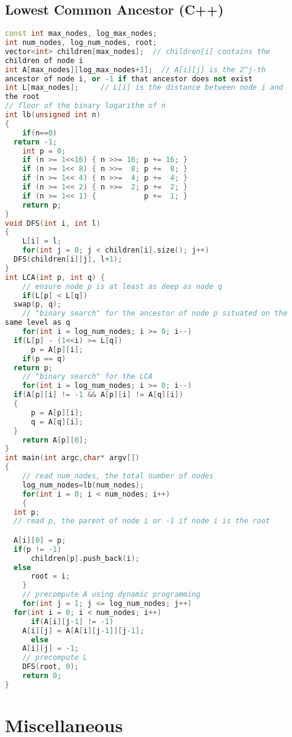 \subsection{Lowest Common Ancestor (C++)}
\begin{lstlisting}[language=C++]
const int max_nodes, log_max_nodes;
int num_nodes, log_num_nodes, root;
vector<int> children[max_nodes];  // children[i] contains the 
children of node i
int A[max_nodes][log_max_nodes+1];  // A[i][j] is the 2^j-th 
ancestor of node i, or -1 if that ancestor does not exist
int L[max_nodes];     // L[i] is the distance between node i and 
the root
// floor of the binary logarithm of n
int lb(unsigned int n)
{
    if(n==0)
  return -1;
    int p = 0;
    if (n >= 1<<16) { n >>= 16; p += 16; }
    if (n >= 1<< 8) { n >>=  8; p +=  8; }
    if (n >= 1<< 4) { n >>=  4; p +=  4; }
    if (n >= 1<< 2) { n >>=  2; p +=  2; }
    if (n >= 1<< 1) {           p +=  1; }
    return p;
}
void DFS(int i, int l)
{
    L[i] = l;
    for(int j = 0; j < children[i].size(); j++)
  DFS(children[i][j], l+1);
}
int LCA(int p, int q) {
    // ensure node p is at least as deep as node q
    if(L[p] < L[q])
  swap(p, q);
    // "binary search" for the ancestor of node p situated on the 
same level as q
    for(int i = log_num_nodes; i >= 0; i--)
  if(L[p] - (1<<i) >= L[q])
      p = A[p][i];
    if(p == q)
  return p;
    // "binary search" for the LCA
    for(int i = log_num_nodes; i >= 0; i--)
  if(A[p][i] != -1 && A[p][i] != A[q][i])
  {
      p = A[p][i];
      q = A[q][i];
  }
    return A[p][0];
}
int main(int argc,char* argv[])
{
    // read num_nodes, the total number of nodes
    log_num_nodes=lb(num_nodes);
    for(int i = 0; i < num_nodes; i++)
    {
  int p;
  // read p, the parent of node i or -1 if node i is the root

  A[i][0] = p;
  if(p != -1)
      children[p].push_back(i);
  else
      root = i;
    }
    // precompute A using dynamic programming
    for(int j = 1; j <= log_num_nodes; j++)
  for(int i = 0; i < num_nodes; i++)
      if(A[i][j-1] != -1)
    A[i][j] = A[A[i][j-1]][j-1];
      else
    A[i][j] = -1;
    // precompute L
    DFS(root, 0);   
    return 0;
}
\end{lstlisting}
\section{Miscellaneous}
